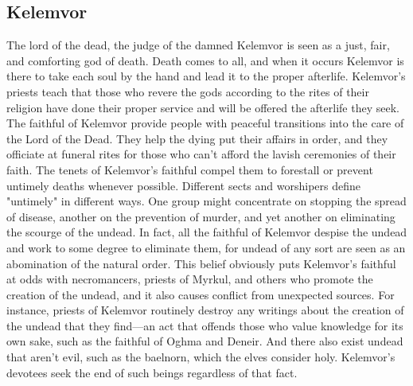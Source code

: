 \documentclass[10pt,a4paper,twoside,twocolumn,openany,bg=print,nodeprecatedcode]{dndbook}
\begin{document}
\subsection{Kelemvor}
The lord of the dead, the judge of the damned
Kelemvor is seen as a just, fair, and comforting god of death. Death comes to all, and when it occurs Kelemvor is there to take each soul by the hand and lead it to the proper afterlife. Kelemvor's priests teach that those who revere the gods according to the rites of their religion have done their proper service and will be offered the afterlife they seek.
The faithful of Kelemvor provide people with peaceful transitions into the care of the Lord of the Dead. They help the dying put their affairs in order, and they officiate at funeral rites for those who can't afford the lavish ceremonies of their faith. The tenets of Kelemvor's faithful compel them to forestall or prevent untimely deaths whenever possible. Different sects and worshipers define "untimely" in different ways. One group might concentrate on stopping the spread of disease, another on the prevention of murder, and yet another on eliminating the scourge of the undead. In fact, all the faithful of Kelemvor despise the undead and work to some degree to eliminate them, for undead of any sort are seen as an abomination of the natural order. This belief obviously puts Kelemvor's faithful at odds with necromancers, priests of Myrkul, and others who promote the creation of the undead, and it also causes conflict from unexpected sources. For instance, priests of Kelemvor routinely destroy any writings about the creation of the undead that they find—an act that offends those who value knowledge for its own sake, such as the faithful of Oghma and Deneir. And there also exist undead that aren't evil, such as the baelnorn, which the elves consider holy. Kelemvor's devotees seek the end of such beings regardless of that fact.
\end{document}
